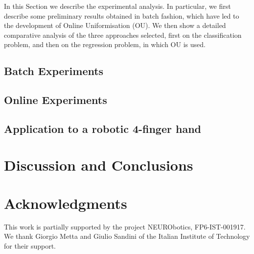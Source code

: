 \documentclass[twocolumn,referee]{svjour2}
\begin{document}
In this Section we describe the experimental analysis. In particular,
we first describe some preliminary results obtained in batch fashion,
which have led to the development of Online Uniformisation (OU). We
then show a detailed comparative analysis of the three approaches
selected, first on the classification problem, and then on the
regression problem, in which OU is used.

\subsection{Batch Experiments}
\label{subsec:strategy}


\subsection{Online Experiments}
\label{subsec:online}


\subsection{Application to a robotic 4-finger hand}
\label{subsec:application}


\section{Discussion and Conclusions}
\label{sec:discussion}


\section*{Acknowledgments}

This work is partially supported by the project NEURObotics,
FP6-IST-001917. We thank Giorgio Metta and Giulio Sandini of the
Italian Institute of Technology for their support.

{\small

%

}


\end{document}
